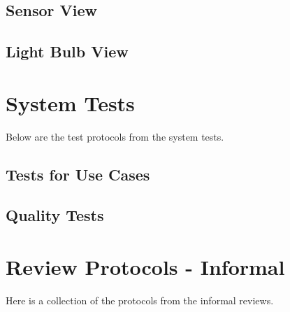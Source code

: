 \documentclass[a4paper]{article}
\begin{document}
\subsection{Sensor View}




\subsection{Light Bulb View}



\newpage
\section{System Tests}
Below are the test protocols from the system tests.

\subsection{Tests for Use Cases}



\subsection{Quality Tests}



\newpage
\section{Review Protocols - Informal}
Here is a collection of the protocols from the informal reviews.










\end{document}
